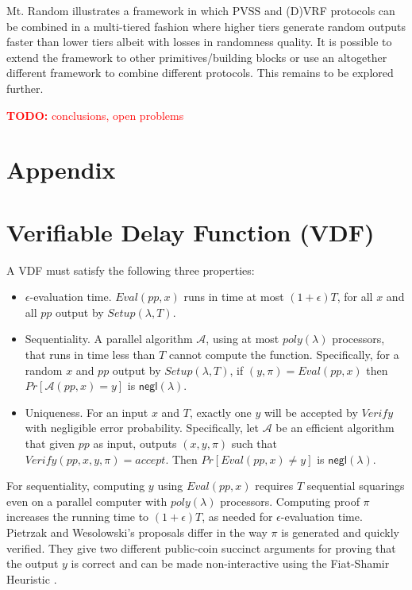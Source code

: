 \documentclass[letterpaper,twocolumn,10pt]{article}
\theoremstyle{definition}
\theoremstyle{remark}
\newcommand{\todo}[1]{\textcolor{red}{\textbf{TODO:} #1}}
\begin{document}
Mt. Random illustrates a framework in which PVSS and (D)VRF protocols can be combined in a multi-tiered fashion where higher tiers generate random outputs faster than lower tiers albeit with losses in randomness quality. It is possible to extend the framework to other primitives/building blocks or use an altogether different framework to combine different protocols. This remains to be explored further.

\todo{conclusions, open problems}

\printbibliography
\appendix
\section*{Appendix}
\renewcommand{\thesection}{\arabic{section}}
\section{Verifiable Delay Function (VDF)}
\label{appendix:vdf}

A VDF must satisfy the following three properties:
\begin{itemize}
\item $\epsilon$-evaluation time. $Eval(pp, x)$ runs in time at most $(1 + \epsilon) T$, for all $x$ and all $pp$ output by $Setup(\lambda, T)$.
\item Sequentiality. A parallel algorithm $\mathcal{A}$, using at most $poly(\lambda)$ processors, that runs in time less than $T$ cannot compute the function. Specifically, for a random $x$ and $pp$ output by $Setup(\lambda, T)$, if $(y, \pi) = Eval(pp, x)$ then $Pr[\mathcal{A}(pp, x) = y]$ is $\mathsf{negl(\lambda)}$.
\item Uniqueness. For an input $x$ and $T$, exactly one $y$ will be accepted by $Verify$ with negligible error probability. Specifically, let $\mathcal{A}$ be an efficient algorithm that given $pp$ as input, outputs $(x, y, \pi)$ such that $Verify(pp, x, y, \pi) = accept$. Then $Pr[Eval(pp, x) \neq y]$ is $\mathsf{negl(\lambda)}$.
\end{itemize}
For sequentiality, computing $y$ using $Eval(pp,x)$ requires $T$ sequential squarings even on a parallel computer with $poly(\lambda)$ processors. Computing proof $\pi$ increases the running time to $(1+\epsilon)T$, as needed for $\epsilon$-evaluation time. Pietrzak \cite{pietrzak2018simple} and Wesolowski's \cite{wesolowski2019efficient} proposals differ in the way $\pi$ is generated and quickly verified. They give two different public-coin succinct arguments for proving that the output $y$ is correct and can be made non-interactive using the Fiat-Shamir Heuristic \cite{amos1986prove}. 
\end{document}
